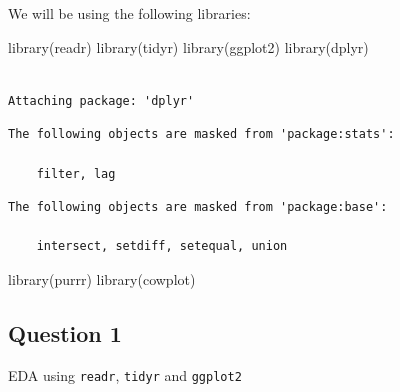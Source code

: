 \documentclass[
  letterpaper,
  DIV=11,
  numbers=noendperiod]{scrartcl}
\newenvironment{Shaded}{\begin{snugshade}}{\end{snugshade}}
\newcommand{\FunctionTok}[1]{\textcolor[rgb]{0.28,0.35,0.67}{#1}}
\newcommand{\NormalTok}[1]{\textcolor[rgb]{0.00,0.23,0.31}{#1}}
\begin{document}
We will be using the following libraries:

\begin{Shaded}
\begin{Highlighting}[]
\FunctionTok{library}\NormalTok{(readr)}
\FunctionTok{library}\NormalTok{(tidyr)}
\FunctionTok{library}\NormalTok{(ggplot2)}
\FunctionTok{library}\NormalTok{(dplyr)}
\end{Highlighting}
\end{Shaded}

\begin{verbatim}

Attaching package: 'dplyr'
\end{verbatim}

\begin{verbatim}
The following objects are masked from 'package:stats':

    filter, lag
\end{verbatim}

\begin{verbatim}
The following objects are masked from 'package:base':

    intersect, setdiff, setequal, union
\end{verbatim}

\begin{Shaded}
\begin{Highlighting}[]
\FunctionTok{library}\NormalTok{(purrr)}
\FunctionTok{library}\NormalTok{(cowplot)}
\end{Highlighting}
\end{Shaded}

\hypertarget{section}{%
\subsection{\texorpdfstring{}{    }}\label{section}}

\hypertarget{question-1}{%
\subsection{Question 1}\label{question-1}}

\begin{tcolorbox}[enhanced jigsaw, opacityback=0, colback=white, rightrule=.15mm, colframe=quarto-callout-tip-color-frame, opacitybacktitle=0.6, title=\textcolor{quarto-callout-tip-color}{\faLightbulb}\hspace{0.5em}{30 points}, breakable, bottomtitle=1mm, arc=.35mm, titlerule=0mm, toptitle=1mm, leftrule=.75mm, left=2mm, bottomrule=.15mm, toprule=.15mm, coltitle=black, colbacktitle=quarto-callout-tip-color!10!white]

EDA using \texttt{readr}, \texttt{tidyr} and \texttt{ggplot2}

\end{tcolorbox}
\end{document}
